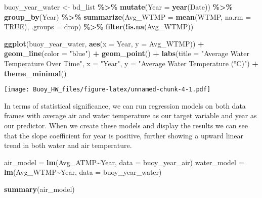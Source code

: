 \documentclass[
]{article}
\newenvironment{Shaded}{\begin{snugshade}}{\end{snugshade}}
\newcommand{\AttributeTok}[1]{\textcolor[rgb]{0.13,0.29,0.53}{#1}}
\newcommand{\ConstantTok}[1]{\textcolor[rgb]{0.56,0.35,0.01}{#1}}
\newcommand{\FunctionTok}[1]{\textcolor[rgb]{0.13,0.29,0.53}{\textbf{#1}}}
\newcommand{\NormalTok}[1]{#1}
\newcommand{\OtherTok}[1]{\textcolor[rgb]{0.56,0.35,0.01}{#1}}
\newcommand{\SpecialCharTok}[1]{\textcolor[rgb]{0.81,0.36,0.00}{\textbf{#1}}}
\newcommand{\StringTok}[1]{\textcolor[rgb]{0.31,0.60,0.02}{#1}}
\begin{document}
\begin{Shaded}
\begin{Highlighting}[]
\NormalTok{buoy\_year\_water }\OtherTok{\textless{}{-}}\NormalTok{ bd\_list }\SpecialCharTok{\%\textgreater{}\%}
  \FunctionTok{mutate}\NormalTok{(}\AttributeTok{Year =} \FunctionTok{year}\NormalTok{(Date)) }\SpecialCharTok{\%\textgreater{}\%}
  \FunctionTok{group\_by}\NormalTok{(Year) }\SpecialCharTok{\%\textgreater{}\%}
  \FunctionTok{summarize}\NormalTok{(}\AttributeTok{Avg\_WTMP =} \FunctionTok{mean}\NormalTok{(WTMP, }\AttributeTok{na.rm =} \ConstantTok{TRUE}\NormalTok{), }\AttributeTok{.groups =} \StringTok{\textquotesingle{}drop\textquotesingle{}}\NormalTok{) }\SpecialCharTok{\%\textgreater{}\%}
  \FunctionTok{filter}\NormalTok{(}\SpecialCharTok{!}\FunctionTok{is.na}\NormalTok{(Avg\_WTMP)) }

\FunctionTok{ggplot}\NormalTok{(buoy\_year\_water, }\FunctionTok{aes}\NormalTok{(}\AttributeTok{x =}\NormalTok{ Year, }\AttributeTok{y =}\NormalTok{ Avg\_WTMP)) }\SpecialCharTok{+}
  \FunctionTok{geom\_line}\NormalTok{(}\AttributeTok{color =} \StringTok{"blue"}\NormalTok{) }\SpecialCharTok{+}
  \FunctionTok{geom\_point}\NormalTok{() }\SpecialCharTok{+}
  \FunctionTok{labs}\NormalTok{(}\AttributeTok{title =} \StringTok{"Average Water Temperature Over Time"}\NormalTok{,}
       \AttributeTok{x =} \StringTok{"Year"}\NormalTok{,}
       \AttributeTok{y =} \StringTok{"Average Water Temperature (°C)"}\NormalTok{) }\SpecialCharTok{+}
  \FunctionTok{theme\_minimal}\NormalTok{()}
\end{Highlighting}
\end{Shaded}

\texttt{[image: Buoy\_HW\_files/figure-latex/unnamed-chunk-4-1.pdf]}

In terms of statistical significance, we can run regression models on
both data frames with average air and water temperature as our target
variable and year as our predictor. When we create these models and
display the results we can see that the slope coefficient for year is
positive, further showing a upward linear trend in both water and air
temperature.

\begin{Shaded}
\begin{Highlighting}[]
\NormalTok{air\_model }\OtherTok{=} \FunctionTok{lm}\NormalTok{(Avg\_ATMP}\SpecialCharTok{\textasciitilde{}}\NormalTok{Year, }\AttributeTok{data =}\NormalTok{ buoy\_year\_air)}
\NormalTok{water\_model }\OtherTok{=} \FunctionTok{lm}\NormalTok{(Avg\_WTMP}\SpecialCharTok{\textasciitilde{}}\NormalTok{Year, }\AttributeTok{data =}\NormalTok{ buoy\_year\_water)}

\FunctionTok{summary}\NormalTok{(air\_model)}
\end{Highlighting}
\end{Shaded}
\end{document}
